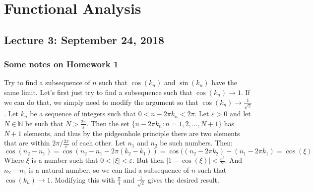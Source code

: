 \documentclass[crop=false,class=article,oneside]{standalone}
\begin{document}
    \ifx\ifsub\undefined
        \section*{Functional Analysis}
        \setcounter{section}{1}
        \setcounter{subsection}{1}
    \fi
    \subsection{Lecture 3: September 24, 2018}
        \subsubsection{Some notes on Homework 1}
            Try to find a subsequence of $n$ such
            that $\cos(k_{n})$ and $\sin(k_{n})$
            have the same limit. Let's first just
            try to find a subsequence such that
            $\cos(k_{n})\rightarrow{1}$. If we can
            do that, we simply need to modify the
            argument so that
            $\cos(k_{n})\rightarrow{\frac{1}{\sqrt{2}}}$.
            Let $k_{n}$ be a sequence of integers
            such that $0<n-2\pi{k_{n}}<2\pi$.
            Let $\varepsilon>0$ and let $N\in\mathbb{N}$
            be such that $N>\frac{2\pi}{\varepsilon}$.
            Then the set
            $\{n-2\pi{k_{n}}:n=1,2,\hdots,N+1\}$
            has $N+1$ elements, and thus by the
            pidgeonhole principle there are two
            elements that are within
            $2\pi/\frac{2\pi}{\varepsilon}$ of each other.
            Let $n_{1}$ and $n_{2}$ be such numbers.
            Then:
            \begin{equation*}
                \cos(n_{2}-n_{1})
                =\cos(n_{2}-n_{1}-2\pi(k_{2}-k_{1}))
                =\cos((n_{2}-2\pi{k}_{2})
                       -(n_{1}-2\pi{k_{1}})
                =\cos(\xi)
            \end{equation*}
            Where $\xi$ is a number such that
            $0<|\xi|<\varepsilon$. But then
            $|1-\cos(\xi)|<\frac{\varepsilon^{2}}{2}$.
            And $n_{2}-n_{1}$ is a natural number,
            so we can find a subsequence of $n$ such
            that $\cos(k_{n})\rightarrow{1}$. Modifying
            this with $\frac{\pi}{4}$
            and $\frac{1}{\sqrt{2}}$ gives the
            desired result.
\end{document}
